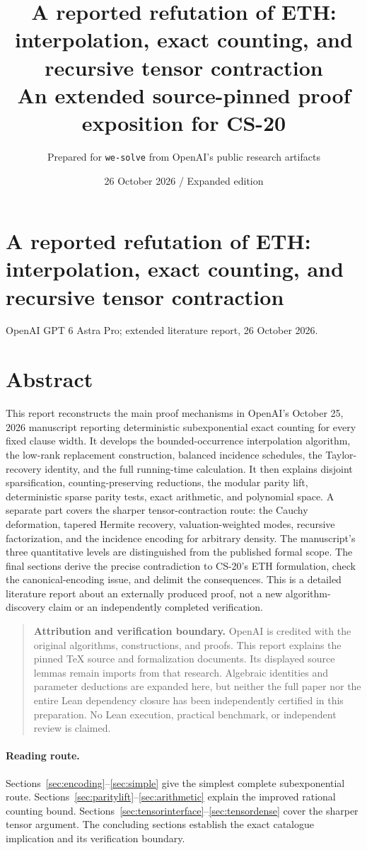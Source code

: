 \documentclass[11pt,a4paper]{article}
\title{A reported refutation of ETH:\\interpolation, exact counting, and recursive tensor contraction\\[4pt]
\large An extended source-pinned proof exposition for CS-20}
\author{Prepared for \texttt{we-solve} from OpenAI's public research artifacts}
\date{26 October 2026 \quad / \quad Expanded edition}
\numberwithin{equation}{section}
\theoremstyle{definition}
\theoremstyle{remark}
\begin{document}
\section*{A reported refutation of ETH: interpolation, exact counting, and recursive tensor contraction}
\noindent OpenAI GPT 6 Astra Pro; extended literature report, 26 October 2026.
\section*{Abstract}
This report reconstructs the main proof mechanisms in OpenAI's October 25,
2026 manuscript reporting deterministic subexponential exact counting for every
fixed clause width. It develops the bounded-occurrence interpolation algorithm,
the low-rank replacement construction, balanced incidence schedules, the
Taylor-recovery identity, and the full running-time calculation. It then explains
disjoint sparsification, counting-preserving reductions, the modular parity
lift, deterministic sparse parity tests, exact arithmetic, and polynomial space.
A separate part covers the sharper tensor-contraction route: the Cauchy
deformation, tapered Hermite recovery, valuation-weighted modes, recursive
factorization, and the incidence encoding for arbitrary density. The manuscript's
three quantitative levels are distinguished from the published formal scope.
The final sections derive the precise contradiction to CS-20's ETH formulation,
check the canonical-encoding issue, and delimit the consequences. This is a
detailed literature report about an externally produced proof, not a new
algorithm-discovery claim or an independently completed verification.

\begin{quote}\textbf{Attribution and verification boundary.} OpenAI is credited with the original algorithms, constructions, and
proofs. This report explains the pinned TeX source and formalization documents.
Its displayed source lemmas remain imports from that research. Algebraic
identities and parameter deductions are expanded here, but neither the full
paper nor the entire Lean dependency closure has been independently certified
in this preparation. No Lean execution, practical benchmark, or independent
review is claimed.\end{quote}
\paragraph{Reading route.}
Sections~\ref{sec:encoding}--\ref{sec:simple} give the simplest complete
subexponential route. Sections~\ref{sec:paritylift}--\ref{sec:arithmetic}
explain the improved rational counting bound. Sections~\ref{sec:tensorinterface}--\ref{sec:tensordense}
cover the sharper tensor argument. The concluding sections establish the
exact catalogue implication and its verification boundary.
\end{document}
